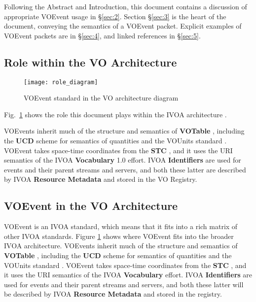 \documentclass[11pt,a4paper]{ivoa}
\begin{document}
Following the Abstract and Introduction, this document contains a discussion of
appropriate VOEvent usage in \S\ref{sec:2}. Section \S\ref{sec:3} is the heart
of the document, conveying the semantics of a VOEvent packet. Explicit examples
of VOEvent packets are in \S\ref{sec:4}, and linked references in \S\ref{sec:5}.

\subsection{Role within the VO Architecture}

\begin{figure}[ht!]
\centering\texttt{[image: role\_diagram]}
\caption{VOEvent standard in the VO architecture diagram}
\label{fig:diagram}
\end{figure}

Fig.~\ref{fig:diagram} shows the role this document plays within the
IVOA architecture \citep{2021ivoa.spec.1101D}.

VOEvents inherit much of the structure and semantics of {\bf
VOTable} \citep{2019ivoa.spec.1021O}, including the {\bf UCD}
\citep{2018ivoa.spec.0527P} scheme for semantics of quantities and the VOUnits
standard \citep{2023ivoa.spec.1215G}. VOEvent takes space-time coordinates from
the {\bf STC} \citep{2007ivoa.spec.1030R}, and it uses the URI semantics of the
IVOA {\bf Vocabulary} 1.0 \citep{2009ivoa.spec.1007G} effort. IVOA {\bf Identifiers}
\citep{2016ivoa.spec.0523D} are used for events and their parent streams and
servers, and both these latter are described by IVOA {\bf Resource Metadata}
\citep{2007ivoa.spec.0302H} and stored in the VO Registry.

\subsection{VOEvent in the VO Architecture}

VOEvent is an IVOA standard, which means that it fits into a rich matrix of
other IVOA standards. Figure \ref{fig:diagram} shows where VOEvent fits into the broader
IVOA architecture. VOEvents inherit much of the structure and semantics of {\bf
VOTable} \citep{2019ivoa.spec.1021O}, including the {\bf UCD} 
\citep{2018ivoa.spec.0527P} scheme for semantics of quantities and the VOUnits
standard \citep{2014ivoa.spec.0523D}. VOEvent takes space-time coordinates from
the {\bf STC} \citep{2007ivoa.spec.1030R}, and it uses the URI semantics of the
IVOA {\bf Vocabulary} \citep{2009ivoa.spec.1007G} effort. IVOA {\bf Identifiers}
\citep{2016ivoa.spec.0523D} are used for events and their parent streams and
servers, and both these latter will be described by IVOA {\bf Resource Metadata}
\citep{2007ivoa.spec.0302H} and stored in the registry. 
\end{document}
